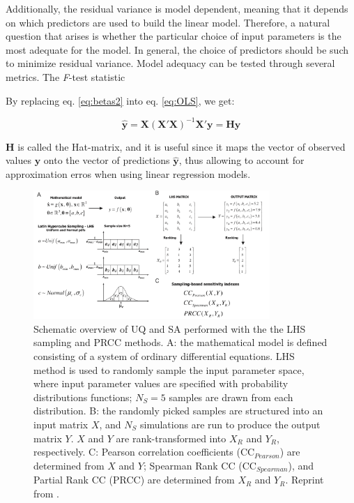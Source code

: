 \documentclass[12pt]{article}
\begin{document}
{Additionally, the residual variance is model dependent, meaning that it depends on which predictors are used to build the linear model. Therefore, a natural question that arises is whether the particular choice of input parameters is the most adequate for the model. In general, the choice of predictors should be such to minimize residual variance. Model adequacy can be tested through several metrics. The \textit{F}-test statistic 


By replacing eq. \ref{eq:betas2} into eq. \ref{eq:OLS}, we get:

\begin{equation} \label{eq:hatMatrix}
\mathbf{\hat y}=\mathbf{X}(\mathbf{X}'\mathbf{X})^{-1}\mathbf{X}'\mathbf{y} = \mathbf{H}\mathbf{y}
\end{equation}

$\mathbf{H}$ is called the Hat-matrix, and it is useful since it maps the vector of observed values $\mathbf{y}$ onto the vector of predictions $\mathbf{\hat y}$, thus allowing to account for approximation erros when using linear regression models.

\begin{figure}[h]
	\centering
	\includegraphics[width=0.8\textwidth]{images/correlation_UQ_SA2.png}
	\caption{Schematic overview of UQ and SA performed with the the LHS sampling and PRCC methods. A: the mathematical model is defined consisting of a system of ordinary differential equations. LHS method is used to randomly sample the input parameter space, where input parameter values are specified with probability distributions functions; $N_{S}=5$ samples are drawn from each distribution. B: the randomly picked samples are structured into an input matrix $X$, and $N_{S}$ simulations are run to produce the output matrix $Y$. $X$ and $Y$ are rank-transformed into $X_{R}$ and $Y_{R}$, respectively. C: Pearson correlation coefficients (CC$_{Pearson}$) are determined from $X$ and $Y$; Spearman Rank CC (CC$_{Spearman}$), and Partial Rank CC (PRCC) are determined from $X_{R}$ and $Y_{R}$. Reprint from \cite{MARINO}.}
	\label{fig:correlation_UQ_SA}
\end{figure}

}
\end{document}
